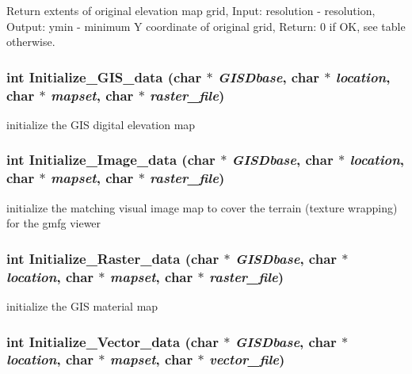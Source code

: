 Return extents of original elevation map grid, Input: resolution - resolution, Output: ymin - minimum Y coordinate of original grid, Return: 0 if OK, see table otherwise. 

\hypertarget{GisApi_8C_a32}{
\subsubsection[Initialize\_\-GIS\_\-data]{\setlength{\rightskip}{0pt plus 5cm}int Initialize\_\-GIS\_\-data (char $\ast$ {\em GISDbase}, char $\ast$ {\em location}, char $\ast$ {\em mapset}, char $\ast$ {\em raster\_\-file})}}
\label{GisApi_8C_a32}


initialize the GIS digital elevation map 

\hypertarget{GisApi_8C_a35}{
\subsubsection[Initialize\_\-Image\_\-data]{\setlength{\rightskip}{0pt plus 5cm}int Initialize\_\-Image\_\-data (char $\ast$ {\em GISDbase}, char $\ast$ {\em location}, char $\ast$ {\em mapset}, char $\ast$ {\em raster\_\-file})}}
\label{GisApi_8C_a35}


initialize the matching visual image map to cover the terrain (texture wrapping) for the gmfg viewer 

\hypertarget{GisApi_8C_a34}{
\subsubsection[Initialize\_\-Raster\_\-data]{\setlength{\rightskip}{0pt plus 5cm}int Initialize\_\-Raster\_\-data (char $\ast$ {\em GISDbase}, char $\ast$ {\em location}, char $\ast$ {\em mapset}, char $\ast$ {\em raster\_\-file})}}
\label{GisApi_8C_a34}


initialize the GIS material map 

\hypertarget{GisApi_8C_a24}{
\subsubsection[Initialize\_\-Vector\_\-data]{\setlength{\rightskip}{0pt plus 5cm}int Initialize\_\-Vector\_\-data (char $\ast$ {\em GISDbase}, char $\ast$ {\em location}, char $\ast$ {\em mapset}, char $\ast$ {\em vector\_\-file})}}
\label{GisApi_8C_a24}


